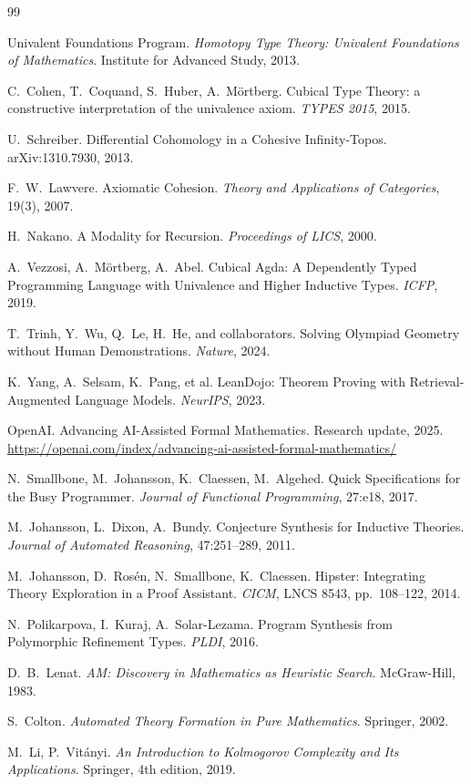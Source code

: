\documentclass[11pt,a4paper]{article}
\begin{document}
\begin{thebibliography}{99}

Univalent Foundations Program.
\textit{Homotopy Type Theory: Univalent Foundations of Mathematics}.
Institute for Advanced Study, 2013.

C.~Cohen, T.~Coquand, S.~Huber, A.~M\"ortberg.
Cubical Type Theory: a constructive interpretation of the univalence axiom.
\textit{TYPES 2015}, 2015.

U.~Schreiber.
Differential Cohomology in a Cohesive Infinity-Topos.
arXiv:1310.7930, 2013.

F.~W.~Lawvere.
Axiomatic Cohesion.
\textit{Theory and Applications of Categories}, 19(3), 2007.

H.~Nakano.
A Modality for Recursion.
\textit{Proceedings of LICS}, 2000.

A.~Vezzosi, A.~M\"ortberg, A.~Abel.
Cubical Agda: A Dependently Typed Programming Language with Univalence and Higher Inductive Types.
\textit{ICFP}, 2019.

T.~Trinh, Y.~Wu, Q.~Le, H.~He, and collaborators.
Solving Olympiad Geometry without Human Demonstrations.
\textit{Nature}, 2024.

K.~Yang, A.~Selsam, K.~Pang, et al.
LeanDojo: Theorem Proving with Retrieval-Augmented Language Models.
\textit{NeurIPS}, 2023.

OpenAI.
Advancing AI-Assisted Formal Mathematics.
Research update, 2025.
\url{https://openai.com/index/advancing-ai-assisted-formal-mathematics/}

N.~Smallbone, M.~Johansson, K.~Claessen, M.~Algehed.
Quick Specifications for the Busy Programmer.
\textit{Journal of Functional Programming}, 27:e18, 2017.

M.~Johansson, L.~Dixon, A.~Bundy.
Conjecture Synthesis for Inductive Theories.
\textit{Journal of Automated Reasoning}, 47:251--289, 2011.

M.~Johansson, D.~Ros\'en, N.~Smallbone, K.~Claessen.
Hipster: Integrating Theory Exploration in a Proof Assistant.
\textit{CICM}, LNCS 8543, pp.~108--122, 2014.

N.~Polikarpova, I.~Kuraj, A.~Solar-Lezama.
Program Synthesis from Polymorphic Refinement Types.
\textit{PLDI}, 2016.

D.~B.~Lenat.
\textit{AM: Discovery in Mathematics as Heuristic Search}.
McGraw-Hill, 1983.

S.~Colton.
\textit{Automated Theory Formation in Pure Mathematics}.
Springer, 2002.

M.~Li, P.~Vit\'anyi.
\textit{An Introduction to Kolmogorov Complexity and Its Applications}.
Springer, 4th edition, 2019.

\end{thebibliography}
\end{document}
